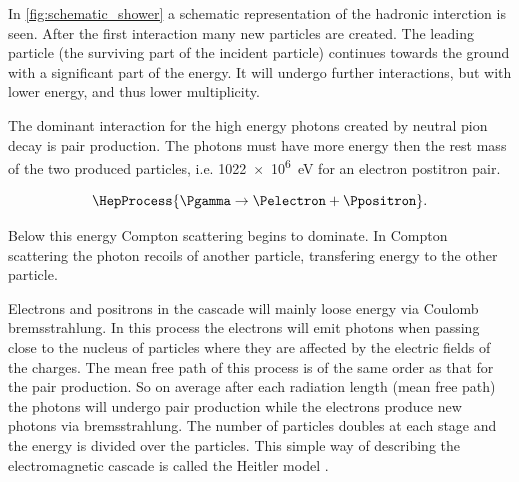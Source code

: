 In \cref{fig:schematic_shower} a schematic representation of the hadronic interction is seen. After the first interaction many new particles are created. The leading particle (the surviving part of the incident particle) continues towards the ground with a significant part of the energy. It will undergo further interactions, but with lower energy, and thus lower multiplicity.

The dominant interaction for the high energy photons created by neutral pion decay is pair production. The photons must have more energy then the rest mass of the two produced particles, i.e. \SI{1022e6}{\eV} for an electron postitron pair.

\begin{equation}
\HepProcess{\Pgamma \to \Pelectron + \Ppositron}.
\end{equation}

Below this energy Compton scattering begins to dominate. In Compton scattering the photon recoils of another particle, transfering energy to the other particle.

Electrons and positrons in the cascade will mainly loose energy via Coulomb bremsstrahlung. In this process the electrons will emit photons when passing close to the nucleus of particles where they are affected by the electric fields of the charges. The mean free path of this process is of the same order as that for the pair production. So on average after each radiation length (mean free path) the photons will undergo pair production while the electrons produce new photons via bremsstrahlung. The number of particles doubles at each stage and the energy is divided over the particles. This simple way of describing the electromagnetic cascade is called the Heitler model \cite{matthews2005heitler}.

